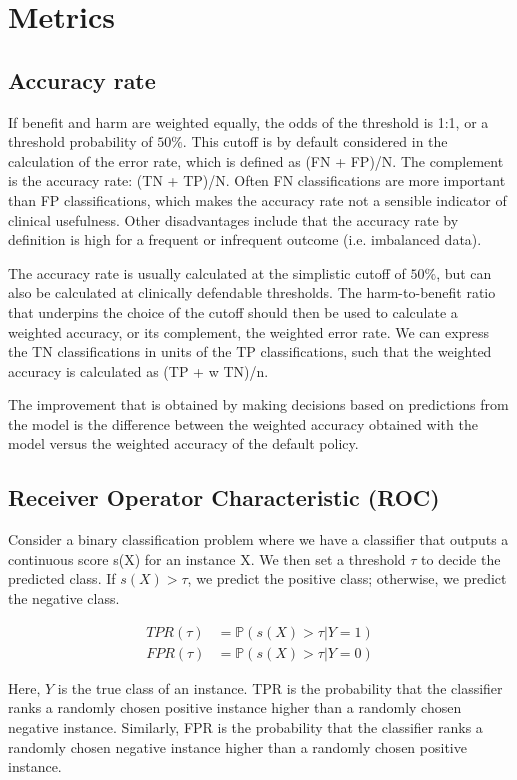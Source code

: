 
\section{Metrics}
\subsection{Accuracy rate}

	If benefit and harm are weighted equally, the odds of the threshold is 1:1, or a threshold probability of $50\%$. 
	This cutoff is by default considered in the calculation of the error rate, which is defined as (FN + FP)/N. 
	The complement is the accuracy rate: (TN + TP)/N.
	Often FN classifications are more important than FP classifications, which makes the accuracy rate not a sensible indicator of clinical usefulness.
	Other disadvantages include that the accuracy rate by definition is high for a frequent or infrequent outcome (i.e. imbalanced data).
	
	The accuracy rate is usually calculated at the simplistic cutoff of $50\%$, but can also be calculated at clinically defendable thresholds. 
	The harm-to-benefit ratio that underpins the choice of the cutoff should then be used to calculate a weighted accuracy, or its complement, the weighted error rate.
	We can express the TN classifications in units of the TP classifications, such that the weighted accuracy is calculated as (TP + w TN)/n.
	
	The improvement that is obtained by making decisions based on predictions from the model is the difference between the weighted accuracy
	obtained with the model versus the weighted accuracy of the default policy.
	
\subsection{Receiver Operator Characteristic (ROC)}
	Consider a binary classification problem where we have a classifier that outputs a continuous score s(X) for an instance X.
	We then set a threshold $\tau$ to decide the predicted class. If $s(X) > \tau$, we predict the positive class; otherwise, we predict the negative class.
	
    	\begin{align*}
    		TPR(\tau) &= \mathbb{P}(s(X) > \tau | Y = 1) \\
    		FPR(\tau) &= \mathbb{P}(s(X) > \tau | Y = 0)
    	\end{align*}
	
	Here, $Y$ is the true class of an instance. 
	TPR is the probability that the classifier ranks a randomly chosen positive instance higher than a randomly chosen negative instance. 
	Similarly, FPR is the probability that the classifier ranks a randomly chosen negative instance higher than a randomly chosen positive instance.
    
